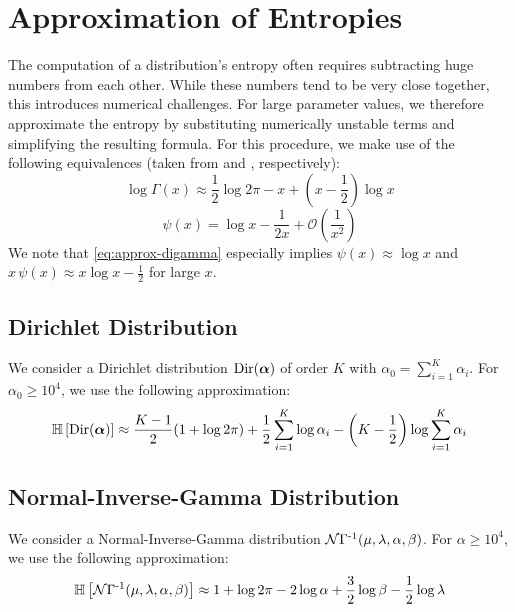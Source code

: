 \section{Approximation of Entropies}

The computation of a distribution's entropy often requires subtracting huge numbers from each other. While these numbers tend to be very close together, this introduces numerical challenges. For large parameter values, we therefore approximate the entropy by substituting numerically unstable terms and simplifying the resulting formula. For this procedure, we make use of the following equivalences (taken from \citet{loggamma} and \citet{digamma}, respectively):
%
\begin{equation}
    \log{\Gamma(x)} \approx \frac{1}{2} \log{2\pi} - x + \left(x - \frac{1}{2}\right) \log{x}
\end{equation}
%
\begin{equation}\label{eq:approx-digamma}
    \psi(x) = \log{x} - \frac{1}{2x} + \mathcal{O}\left( \frac{1}{x^2} \right)
\end{equation}
%
We note that \cref{eq:approx-digamma} especially implies $\psi(x) \approx \log{x}$ and $x \, \psi(x) \approx x \log{x} - \frac{1}{2}$ for large $x$.

\subsection{Dirichlet Distribution}

We consider a Dirichlet distribution $\operatorname{Dir}(\bm{\alpha})$ of order $K$ with $\alpha_0 = \sum_{i=1}^K{\alpha_i}$. For $\alpha_0 \ge 10^4$, we use the following approximation:
%
\begin{equation}
    \operatorname{\mathbb{H}}\left[\operatorname{Dir}(\bm{\alpha})\right] \approx \frac{K-1}{2} (1 + \log{2\pi}) + \frac{1}{2} \sum_{i=1}^K{\log{\alpha_i}} - \left(K - \frac{1}{2}\right) \log{\sum_{i=1}^K{\alpha_i}} 
\end{equation}

\subsection{Normal-Inverse-Gamma Distribution}

We consider a Normal-Inverse-Gamma distribution $\operatorname{\mathcal{N}\Gamma^{-1}}(\mu, \lambda, \alpha, \beta)$. For $\alpha \ge 10^4$, we use the following approximation:
\begin{equation}\label{eq:entropy}
    \operatorname{\mathbb{H}}\left[\operatorname{\mathcal{N}\Gamma^{-1}}(\mu, \lambda, \alpha, \beta)\right] \approx 1 + \log{2\pi} - 2 \log{\alpha} + \frac{3}{2} \log{\beta} - \frac{1}{2} \log{\lambda}
\end{equation}

